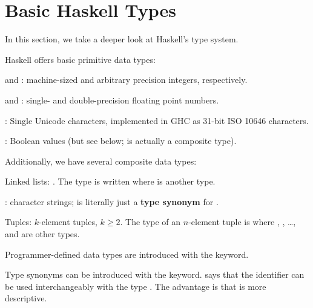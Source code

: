 \section{Basic Haskell Types}

In this section, we take a deeper look at Haskell's type system.

\begin{notelist}
\item Haskell offers basic primitive data types: \cite{haskell98}
\begin{notelist}
    \item {} and : machine-sized and arbitrary precision integers, respectively.
    \item {} and : single- and double-precision floating point numbers.
    \item {}: Single Unicode characters, implemented in GHC as 31-bit ISO 10646 characters.
    \item {}: Boolean values (but see below;  is actually a composite type).
\end{notelist}

\item Additionally, we have several composite data types:
\begin{notelist}
    \item Linked lists: . The type is written \code{[a]} where 
          is another type.
    \item {}: character strings;  is literally just a \textbf{type synonym} for \code{[Char]}.
    \item Tuples: $k$-element tuples, $k \geq 2$. The type of an $n$-element tuple is  where
          , , \ldots, and  are other types.
\end{notelist}

\item Programmer-defined data types are introduced with the  keyword.

\item Type synonyms can be introduced with the  keyword.  says that 
      the identifier  can be used interchangeably with the type . The advantage
      is that  is more descriptive.


\end{notelist}
